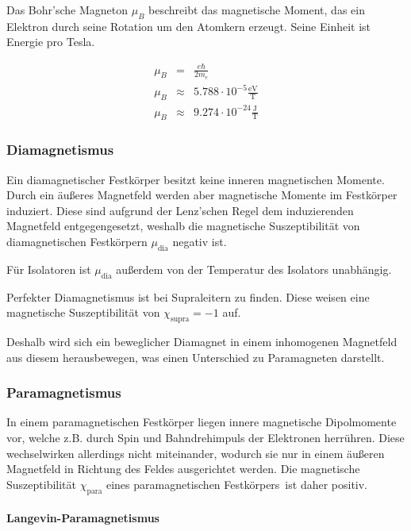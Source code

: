\documentclass[12pt,a4paper]{scrartcl}
\numberwithin{equation}{section} %
\begin{document}
Das Bohr'sche Magneton $\mu_B$ beschreibt das magnetische Moment, das
ein Elektron durch seine Rotation um den Atomkern erzeugt. Seine Einheit
ist Energie pro Tesla.

\begin{eqnarray}
    \mu_B &=& \frac{e\hbar}{2m_e} \\
    \mu_B &\approx& \mathrm{5.788 \cdot 10^{-5} \frac{eV}{T}} \\
    \mu_B &\approx& \mathrm{9.274 \cdot 10^{-24} \frac{J}{T}}
\end{eqnarray}

\hypertarget{diamagnetismus}{%
\subsubsection{Diamagnetismus}\label{diamagnetismus}}

Ein diamagnetischer Festkörper besitzt keine inneren magnetischen
Momente. Durch ein äußeres Magnetfeld werden aber magnetische Momente im
Festkörper induziert. Diese sind aufgrund der Lenz'schen Regel dem
induzierenden Magnetfeld entgegengesetzt, weshalb die magnetische
Suszeptibilität von diamagnetischen Festkörpern $\mu_\mathrm{dia}$
negativ ist.

Für Isolatoren ist $\mu_\mathrm{dia}$ außerdem von der Temperatur des
Isolators unabhängig.

Perfekter Diamagnetismus ist bei Supraleitern zu finden. Diese weisen
eine magnetische Suszeptibilität von $\chi_\mathrm{supra} = -1$ auf.

Deshalb wird sich ein beweglicher Diamagnet in einem inhomogenen
Magnetfeld aus diesem herausbewegen, was einen Unterschied zu
Paramagneten darstellt.

\hypertarget{paramagnetismus}{%
\subsubsection{Paramagnetismus}\label{paramagnetismus}}

In einem paramagnetischen Festkörper liegen innere magnetische
Dipolmomente vor, welche z.B. durch Spin und Bahndrehimpuls der
Elektronen herrühren. Diese wechselwirken allerdings nicht miteinander,
wodurch sie nur in einem äußeren Magnetfeld in Richtung des Feldes
ausgerichtet werden. Die magnetische Suszeptibilität
$\chi_\mathrm{para}$ eines paramagnetischen Festkörpers~ist daher
positiv.

\hypertarget{langevin-paramagnetismus}{%
\paragraph{Langevin-Paramagnetismus}\label{langevin-paramagnetismus}}
\end{document}
